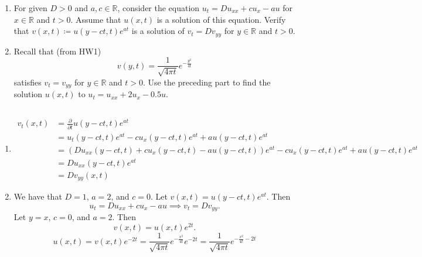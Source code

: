 \documentclass[plain]{pset}
\begin{document}
\begin{problem}
\[\]
\vspace*{-4em}
\begin{enumerate}[label = (\alph*)]
    \item For given \(D > 0\) and \(a, c \in \mathbb{R}\), consider the equation \(u_t = Du_{xx} + cu_x - au\) for \(x \in \mathbb{R}\) and \(t > 0\). Assume that \(u(x, t)\) is a solution of this equation. Verify that \(v(x, t) \coloneqq u(y - ct, t)e^{at}\) is a solution of \(v_t = Dv_{yy}\) for \(y \in \mathbb{R}\) and \(t > 0\).
    \item Recall that (from HW1)
          \[v(y, t) = \frac{1}{\sqrt{4\pi t}}e^{-\frac{y^2}{4t}}\]
          satisfies \(v_t = v_{yy}\) for \(y \in \mathbb{R}\) and \(t > 0\). Use the preceding part to find the solution \(u(x, t)\) to \(u_t = u_{xx} + 2u_x - 0.5u\).
\end{enumerate}
\end{problem}
\begin{solution}
    \[\]
    \vspace*{-4em}
    \begin{enumerate}[label = (\alph*)]
        \item \begin{align*}
                  v_t(x, t) & = \frac{\partial}{\partial t}u(y - ct, t)e^{at}                                                                         \\
                            & = u_t(y - ct, t)e^{at} - cu_x(y - ct, t)e^{at} + au(y - ct, t)e^{at}                                                    \\
                            & = \left(Du_{xx}(y - ct, t) + cu_x(y - ct, t) - au(y - ct, t)\right)e^{at} - cu_x(y - ct, t)e^{at} + au(y - ct, t)e^{at} \\
                            & = Du_{xx}(y - ct, t)e^{at}                                                                                              \\
                            & = Dv_{yy}(x, t)
              \end{align*}
        \item We have that \(D = 1\), \(a = 2\), and \(c = 0\). Let \(v(x, t) = u(y - ct, t)e^{at}\). Then
              \[u_t = Du_{xx} + cu_x - au \implies v_t = Dv_{yy}.\]
              Let \(y = x\), \(c = 0\), and \(a = 2\). Then
              \[v(x, t) = u(x, t)e^{2t}.\]
              \[u(x, t) = v(x, t)e^{-2t} = \frac{1}{\sqrt{4\pi t}}e^{-\frac{x^2}{4t}}e^{-2t} = \frac{1}{\sqrt{4\pi t}}e^{-\frac{x^2}{4t} - 2t}\]
    \end{enumerate}
\end{solution}
\end{document}
